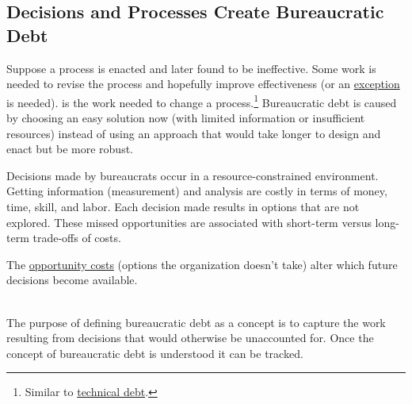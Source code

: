 \subsection*{Decisions and Processes Create Bureaucratic Debt\label{sec:bureaucratic-debt}}


Suppose a \gls{process} is enacted and later found to be ineffective. Some work is needed to revise the process and hopefully improve effectiveness (or an \hyperref[sec:exceptions-to-process]{exception} is needed).
\iftoggle{glossarysubstitutionworks}{\Gls{bureaucratic debt}}{Bureaucratic debt} is 
\iftoggle{glossaryinmargin}{\marginpar{[Glossary]}}{}  the work needed to change a process.\footnote{Similar to \href{https://en.wikipedia.org/wiki/Technical_debt}{technical debt}\iftoggle{boundbook}{; see Wikipedia entry}{}.
}
Bureaucratic debt is caused by choosing an easy solution now (with limited information or insufficient resources) instead of using an approach that would take longer to design and enact but be more robust.


Decisions made by \glspl{bureaucrat} occur in a resource-constrained environment.
Getting information (measurement) and analysis are costly in terms of money, time, skill, and labor.
Each decision made results in options that are not explored. These missed opportunities are associated with short-term versus long-term trade-offs of costs.

The \href{https://en.wikipedia.org/wiki/Opportunity_cost}{opportunity costs}
(options the organization doesn't take) alter which future decisions become available.

\ \\

The purpose of defining bureaucratic debt as a concept is to capture the work resulting from decisions that would otherwise be unaccounted for.
Once the concept of bureaucratic debt is understood it can be tracked.

